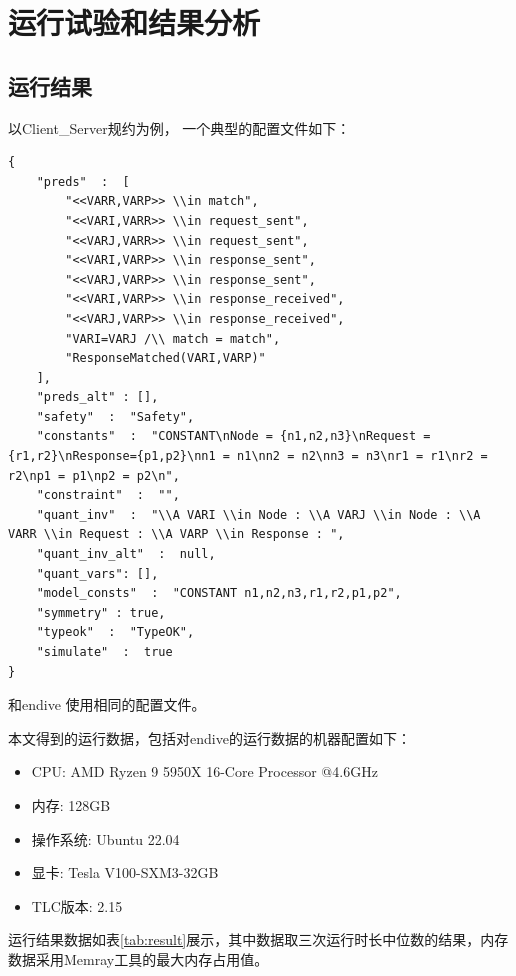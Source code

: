 \chapter{运行试验和结果分析}\label{chap:run-analysis}

\section{运行结果}

以{Client\_Server}规约为例， 一个典型的配置文件如下：
\begin{lstlisting}[label={lst:config},caption={配置文件}]
{
    "preds"  :  [
        "<<VARR,VARP>> \\in match",
        "<<VARI,VARR>> \\in request_sent",
        "<<VARJ,VARR>> \\in request_sent",
        "<<VARI,VARP>> \\in response_sent",
        "<<VARJ,VARP>> \\in response_sent",
        "<<VARI,VARP>> \\in response_received",
        "<<VARJ,VARP>> \\in response_received",
        "VARI=VARJ /\\ match = match",
        "ResponseMatched(VARI,VARP)"
    ],
    "preds_alt" : [],
    "safety"  :  "Safety",
    "constants"  :  "CONSTANT\nNode = {n1,n2,n3}\nRequest = {r1,r2}\nResponse={p1,p2}\nn1 = n1\nn2 = n2\nn3 = n3\nr1 = r1\nr2 = r2\np1 = p1\np2 = p2\n",
    "constraint"  :  "",
    "quant_inv"  :  "\\A VARI \\in Node : \\A VARJ \\in Node : \\A VARR \\in Request : \\A VARP \\in Response : ",
    "quant_inv_alt"  :  null,
    "quant_vars": [],
    "model_consts"  :  "CONSTANT n1,n2,n3,r1,r2,p1,p2",
    "symmetry" : true,
    "typeok"  :  "TypeOK",
    "simulate"  :  true      
}
\end{lstlisting}

\rltla 和endive 使用相同的配置文件。

本文得到的运行数据，包括对endive的运行数据的机器配置如下：
\begin{itemize}
    \item CPU: AMD Ryzen 9 5950X 16-Core Processor @4.6GHz
    \item 内存: 128GB
    \item 操作系统: Ubuntu 22.04
    \item 显卡: Tesla V100-SXM3-32GB
    \item TLC版本: 2.15
\end{itemize}
运行结果数据如表\ref{tab:result}展示，其中数据取三次运行时长中位数的结果，内存数据采用Memray工具的最大内存占用值。

